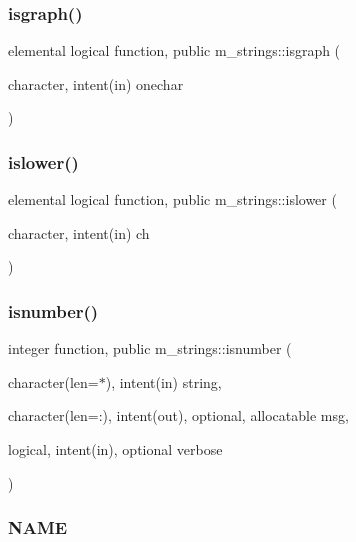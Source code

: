 \subsubsection{\texorpdfstring{isgraph()}{isgraph()}}
{\footnotesize\ttfamily elemental logical function, public m\+\_\+strings\+::isgraph (\begin{DoxyParamCaption}\item[{character, intent(in)}]{onechar }\end{DoxyParamCaption})}

\mbox{\label{namespacem__strings_a9de5290748f02f575f3b7b859ff074ed}} 
\subsubsection{\texorpdfstring{islower()}{islower()}}
{\footnotesize\ttfamily elemental logical function, public m\+\_\+strings\+::islower (\begin{DoxyParamCaption}\item[{character, intent(in)}]{ch }\end{DoxyParamCaption})}

\mbox{\label{namespacem__strings_a2b6c57cbc52fc86d2f02d0936d3484af}} 
\subsubsection{\texorpdfstring{isnumber()}{isnumber()}}
{\footnotesize\ttfamily integer function, public m\+\_\+strings\+::isnumber (\begin{DoxyParamCaption}\item[{character(len=$\ast$), intent(in)}]{string,  }\item[{character(len=\+:), intent(out), optional, allocatable}]{msg,  }\item[{logical, intent(in), optional}]{verbose }\end{DoxyParamCaption})}



\subsubsection*{N\+A\+ME}

